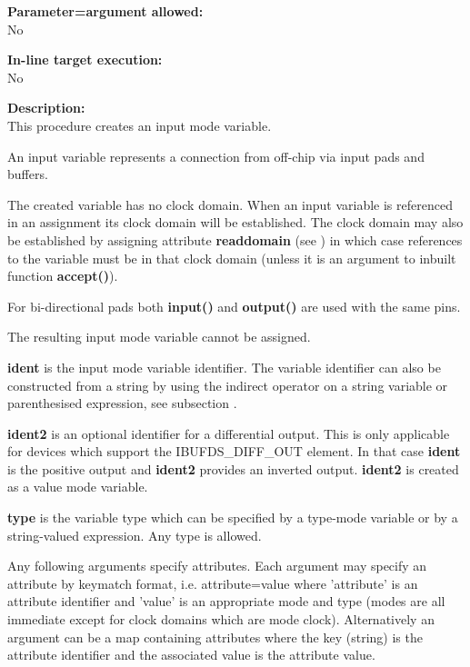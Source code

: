         {\bf Parameter=argument allowed:} \\
        No
        
        {\bf In-line target execution:} \\
        No
        
        {\bf Description:} \\
        This procedure creates an input mode variable.

        An input variable represents a connection from off-chip via input pads
        and buffers.

        The created variable has no clock domain. When an input variable is
        referenced in an assignment its clock domain will be established. The
        clock domain may also be established by assigning attribute {\bf
        readdomain} (see ) in which case references to
        the variable must be in that clock domain (unless it is an argument to
        inbuilt function {\bf accept()}).
        
        For bi-directional pads both {\bf input()} and {\bf output()} are
        used with the same pins.
       
        The resulting input mode variable cannot be assigned.
        
        {\bf ident} is the input mode variable identifier. The variable
        identifier can also be constructed from a string by using the indirect
        operator on a string variable or parenthesised expression, see
        subsection .
        
        {\bf ident2} is an optional identifier for a differential output. This
        is only applicable for devices which support the IBUFDS\_DIFF\_OUT
        element. In that case {\bf ident} is the positive output and {\bf
        ident2} provides an inverted output. {\bf ident2} is created as a
        value mode variable.
        
        {\bf type} is the variable type which can be specified by a type-mode
        variable or by a string-valued expression. Any type is allowed.
        
        Any following arguments specify attributes. Each argument may specify an
        attribute by keymatch format, i.e. attribute=value where 'attribute' is
        an attribute identifier and 'value' is an appropriate mode and type
        (modes are all immediate except for clock domains which are mode clock).
        Alternatively an argument can be a map containing attributes where the
        key (string) is the attribute identifier and the associated value is
        the attribute value.

